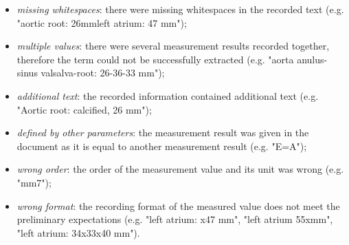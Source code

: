 \begin{itemize}
	\item \textit{missing whitespaces}: there were missing whitespaces in the recorded text (e.g. "aortic root: 26mmleft atrium: 47 mm"); 
	\item \textit{multiple values}: there were several measurement results recorded together, therefore the term could not be successfully extracted (e.g. "aorta anulus-sinus valsalva-root: 26-36-33 mm"); 
	\item \textit{additional text}: the recorded information contained additional text (e.g. "Aortic root: calcified, 26 mm");
	\item \textit{defined by other parameters}: the measurement result was given in the document as it is equal to another measurement result (e.g. "E=A"); 
	\item \textit{wrong order}: the order of the measurement value and its unit was wrong (e.g. "mm7");
	\item \textit{wrong format}: the recording format of the measured value does not meet the preliminary expectations (e.g. "left atrium: x47 mm", "left atrium 55xmm", "left atrium: 34x33x40 mm"). 
\end{itemize}

